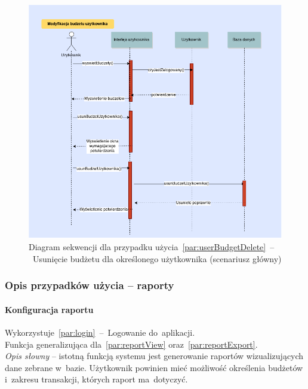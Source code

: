 \begin{figure}[H]
  \includegraphics[width=\textwidth]{images/usun_budzet_uzytkownika.png}
  \caption{Diagram sekwencji dla przypadku użycia~\ref{par:userBudgetDelete}~--~Usunięcie budżetu dla określonego użytkownika (scenariusz główny)}
\end{figure}

\subsubsection{Opis przypadków użycia -- raporty}


\paragraph{Konfiguracja raportu\newline}
\label{par:reportConfig}
Wykorzystuje~\ref{par:login}~--~Logowanie do~aplikacji.\\
\indent Funkcja generalizująca dla~\ref{par:reportView} oraz~\ref{par:reportExport}.\\

\textit{Opis słowny} -- istotną funkcją systemu jest generowanie raportów wizualizujących dane zebrane w~bazie. Użytkownik powinien mieć możliwość określenia budżetów i~zakresu transakcji, których raport ma~dotyczyć.

